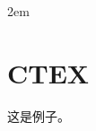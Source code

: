 \documentclass[oneside]{ctexbook}
\begin{document}
\parindent 2em
\chapter{CTEX}
这是例子。
\end{document}
